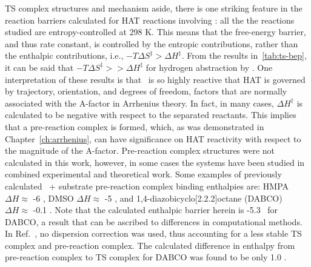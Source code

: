 
TS complex structures and mechanism aside, there is one striking feature in the reaction barriers calculated for HAT reactions involving \cumo: all the the reactions studied are entropy-controlled at 298 K. This means that the free-energy barrier, and thus rate constant, is controlled by the entropic contributions, rather than the enthalpic contributions, i.e., $-T\Delta S^\ddagger > \Delta H^\ddagger$. From the results in~\ref{tab:ts-bep}, it can be said that $-T\Delta S^\ddagger >> \Delta H^\ddagger$ for hydrogen abstraction by \cumo. One interpretation of these results is that \cumo\ is so highly reactive that HAT is governed by trajectory, orientation, and degrees of freedom, factors that are normally associated with the A-factor in Arrhenius theory. In fact, in many cases, $\Delta H^\ddagger$ is calculated to be negative with respect to the separated reactants. This implies that a pre-reaction complex is formed, which, as was demonstrated in Chapter~\ref{ch:arrhenius}, can have significance on HAT reactivity with respect to the magnitude of the A-factor. Pre-reaction complex structures were not calculated in this work, however, in some cases the systems have been studied in combined experimental and theoretical work. Some examples of previously calculated \cumo\ + substrate pre-reaction complex binding enthalpies are: HMPA\footnotemark\ $\Delta H \approx$ -6 \kcalmol, DMSO $\Delta H \approx$ -5 \kcalmol, and 1,4-diazobicyclo[2.2.2]octane (DABCO)\cite{Salamone2011b} $\Delta H \approx$ -0.1 \kcalmol. Note that the calculated enthalpic barrier herein is -5.3 \kcalmol\ for DABCO, a result that can be ascribed to differences in computational methods. In Ref.~, no dispersion correction was used, thus accounting for a less stable TS complex and pre-reaction complex. The calculated difference in enthalpy from pre-reaction complex to TS complex for DABCO was found to be only 1.0 \kcalmol.


